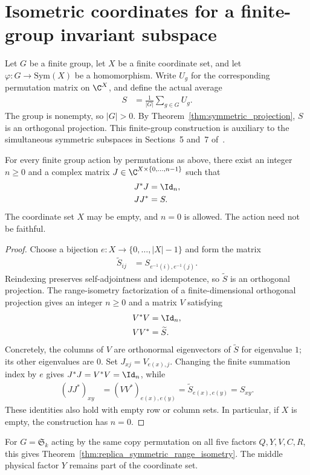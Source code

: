 \section{Isometric coordinates for a finite-group invariant subspace}
\label{sec:symmetric_range_isometry}

Let $G$ be a finite group, let $X$ be a finite coordinate set, and let
$\varphi:G\to\mathrm{Sym}(X)$ be a homomorphism. Write $U_g$ for the
corresponding permutation matrix on $\C^X$, and define the actual average
\begin{align}
  S&=\frac{1}{|G|}\sum_{g\in G}U_g.
\end{align}
The group is nonempty, so $|G|>0$. By
Theorem~\ref{thm:symmetric_projection}, $S$ is an orthogonal projection.
This finite-group construction is auxiliary to the simultaneous symmetric
subspaces in Sections~5 and~7 of~\cite{OpenAI2026AreaLaw}.

\begin{theorem}
  \label{thm:symmetric_range_isometry}
  \leanok
  For every finite group action by permutations as above, there exist an
  integer $n\geq0$ and a complex matrix
  $J\in\C^{X\times\{0,\ldots,n-1\}}$ such that
  \begin{align}
    J^*J&=\Id_n, \\
    JJ^*&=S.
  \end{align}
  The coordinate set $X$ may be empty, and $n=0$ is allowed.
  The action need not be faithful.
\end{theorem}

\begin{proof}
  \leanok
  Choose a bijection $e:X\to\{0,\ldots,|X|-1\}$ and form the matrix
  \begin{align}
    \widetilde S_{ij}&=S_{e^{-1}(i),e^{-1}(j)}.
  \end{align}
  Reindexing preserves self-adjointness and idempotence, so
  $\widetilde S$ is an orthogonal projection. The range-isometry
  factorization of a finite-dimensional orthogonal projection gives
  an integer $n\geq0$ and a matrix $V$ satisfying
  \begin{align}
    V^*V&=\Id_n, \\
    VV^*&=\widetilde S.
  \end{align}
  Concretely, the columns of $V$ are orthonormal eigenvectors of
  $\widetilde S$ for eigenvalue $1$; its other eigenvalues are $0$.
  Set $J_{xj}=V_{e(x),j}$. Changing the finite summation index by $e$
  gives $J^*J=V^*V=\Id_n$, while
  \begin{align}
    (JJ^*)_{xy}&=(VV^*)_{e(x),e(y)}
       =\widetilde S_{e(x),e(y)}=S_{xy}.
  \end{align}
  These identities also hold with empty row or column sets. In particular,
  if $X$ is empty, the construction has $n=0$.
\end{proof}

For $G=\mathfrak S_k$ acting by the same copy permutation on all five
factors $Q,Y,V,C,R$, this gives
Theorem~\ref{thm:replica_symmetric_range_isometry}. The middle physical
factor $Y$ remains part of the coordinate set.
